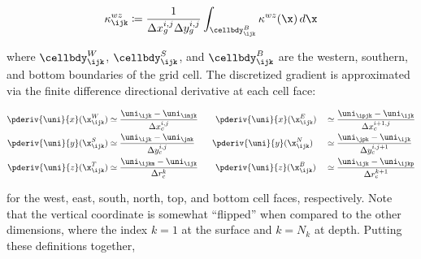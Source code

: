 \documentclass[alpha-refs]{wiley-article}
\begin{document}
\begin{linenomath*}\begin{equation*}
    \kappa^{wz}_{\ijk} \coloneqq \dfrac{1}{\Delta x_g^{i,j}\Delta y_g^{i,j}}
    \int_{\cellbdy_{\ijk}^{B}} \kappa^{wz}(\x)\,d\x
\end{equation*}\end{linenomath*}
where $\cellbdy_{\ijk}^{W}$, $\cellbdy_{\ijk}^{S}$, and $\cellbdy_{\ijk}^{B}$ are the
western, southern, and bottom boundaries of the grid cell.
The discretized gradient is approximated via the finite difference
directional derivative at each cell face:
\begin{linenomath*}\begin{equation*}
    \begin{aligned}
        \pderiv{\uni}{x}(\x_\ijk^W)
        &\simeq \dfrac{\uni_\ijk - \uni_\imjk}{\Delta x_c^{i,j}}
        \qquad
        \pderiv{\uni}{x}(\x_\ijk^E)
        &&\simeq \dfrac{\uni_\ipjk - \uni_\ijk}{\Delta x_c^{i+1,j}}
        \\
        \pderiv{\uni}{y}(\x_\ijk^S)
        &\simeq \dfrac{\uni_\ijk - \uni_\jmk}{\Delta y_c^{i,j}}
        \qquad
        \pderiv{\uni}{y}(\x_\ijk^N)
        &&\simeq \dfrac{\uni_\jpk - \uni_\ijk}{\Delta y_c^{i,j+1}}
        \\
        \pderiv{\uni}{z}(\x_\ijk^T)
        &\simeq \dfrac{\uni_\ijkm - \uni_\ijk}{\Delta r_c^{k}}
        \qquad
        \pderiv{\uni}{z}(\x_\ijk^B)
        &&\simeq \dfrac{\uni_\ijk - \uni_\ijkp}{\Delta r_c^{k+1}}
    \end{aligned}
\end{equation*}\end{linenomath*}
for the west, east, south, north, top, and bottom cell faces, respectively.
Note that the vertical coordinate is somewhat ``flipped'' when compared to the
other dimensions, where the index $k=1$ at the surface and $k=N_k$ at depth.
Putting these definitions together,
\end{document}
